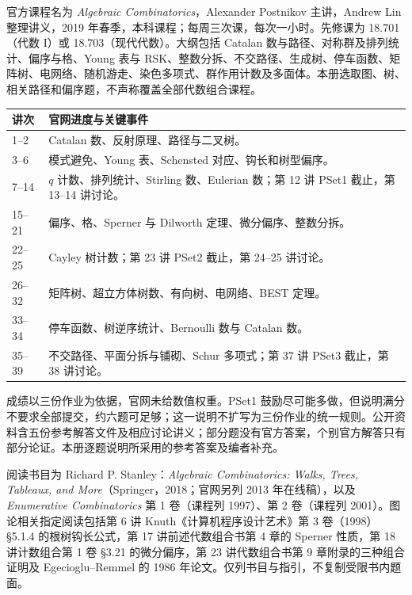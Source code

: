 \par\addvspace{9pt}\par\nobreak\vspace{4pt}
官方课程名为 \textit{Algebraic Combinatorics}，Alexander Postnikov 主讲，Andrew Lin 整理讲义，2019 年春季，本科课程；每周三次课，每次一小时。先修课为 18.701（代数 I）或 18.703（现代代数）。大纲包括 Catalan 数与路径、对称群及排列统计、偏序与格、Young 表与 RSK、整数分拆、不交路径、生成树、停车函数、矩阵树、电网络、随机游走、染色多项式、群作用计数及多面体。本册选取图、树、相关路径和偏序题，不声称覆盖全部代数组合课程。
\begin{longtable}{p{}p{}}
\toprule 讲次 & 官网进度与关键事件\\\midrule\endhead
1--2 & Catalan 数、反射原理、路径与二叉树。\\
3--6 & 模式避免、Young 表、Schensted 对应、钩长和树型偏序。\\
7--14 & $q$ 计数、排列统计、Stirling 数、Eulerian 数；第 12 讲 PSet1 截止，第 13--14 讲讨论。\\
15--21 & 偏序、格、Sperner 与 Dilworth 定理、微分偏序、整数分拆。\\
22--25 & Cayley 树计数；第 23 讲 PSet2 截止，第 24--25 讲讨论。\\
26--32 & 矩阵树、超立方体树数、有向树、电网络、BEST 定理。\\
33--34 & 停车函数、树逆序统计、Bernoulli 数与 Catalan 数。\\
35--39 & 不交路径、平面分拆与铺砌、Schur 多项式；第 37 讲 PSet3 截止，第 38 讲讨论。\\\bottomrule
\end{longtable}
成绩以三份作业为依据，官网未给数值权重。PSet1 鼓励尽可能多做，但说明满分不要求全部提交，约六题可足够；这一说明不扩写为三份作业的统一规则。公开资料含五份参考解答文件及相应讨论讲义；部分题没有官方答案，个别官方解答只有部分论证。本册逐题说明所采用的参考答案及编者补充。

阅读书目为 Richard P. Stanley：\textit{Algebraic Combinatorics: Walks, Trees, Tableaux, and More}（Springer，2018；官网另列 2013 年在线稿），以及 \textit{Enumerative Combinatorics} 第 1 卷（课程列 1997）、第 2 卷（课程列 2001）。图论相关指定阅读包括第 6 讲 Knuth《计算机程序设计艺术》第 3 卷（1998）\S5.1.4 的根树钩长公式，第 17 讲前述代数组合书第 4 章的 Sperner 性质，第 18 讲计数组合第 1 卷 \S3.21 的微分偏序，第 23 讲代数组合书第 9 章附录的三种组合证明及 Egecioglu--Remmel 的 1986 年论文。仅列书目与指引，不复制受限书内题面。

